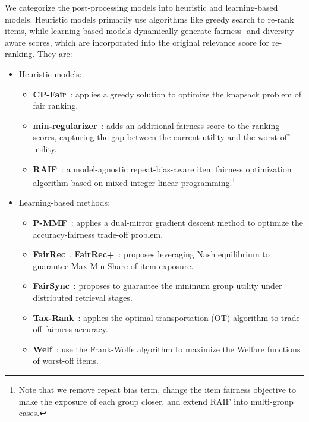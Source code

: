 \noindent%
We categorize the post-processing models into heuristic and learning-based models. Heuristic models primarily use algorithms like greedy search to re-rank items, while learning-based models dynamically generate fairness- and diversity-aware scores, which are incorporated into the original relevance score for re-ranking. They are:


\begin{itemize}[leftmargin=*]
    \item Heuristic models: 
    \begin{itemize}[leftmargin=*]
        \item \textbf{CP-Fair}~\cite{cpfair}: applies a greedy solution to optimize the knapsack problem of fair ranking.
        \item \textbf{min-regularizer}~\cite{xu2023p}: adds an additional fairness score to the ranking scores, capturing the gap between the current utility and the worst-off utility.
        \item \textbf{RAIF}~\cite{liu2025repeat}: a model-agnostic repeat-bias-aware item fairness optimization algorithm based on mixed-integer linear programming.\footnote{Note that we remove repeat bias term, change the item fairness objective to make the exposure of each group closer, and extend RAIF into multi-group cases.}
    \end{itemize}
    
    \item Learning-based methods: 
    \begin{itemize}[leftmargin=*]
        \item \textbf{P-MMF}~\cite{xu2023p}: applies a dual-mirror gradient descent method to optimize the accuracy-fairness trade-off problem.
        \item \textbf{FairRec}~\cite{fairrec}, \textbf{FairRec+}~\cite{fairrecplus}: proposes leveraging Nash equilibrium to guarantee Max-Min Share of item exposure.
        \item \textbf{FairSync}~\cite{fairsync}: proposes to guarantee the minimum group utility under distributed retrieval stages.
        \item \textbf{Tax-Rank}~\cite{TaxRank}: applies the optimal transportation (OT) algorithm to trade-off fairness-accuracy.
        \item \textbf{Welf}~\cite{nips21welf}: use the Frank-Wolfe algorithm to maximize the Welfare functions of worst-off items.
    \end{itemize}
    
\end{itemize}







